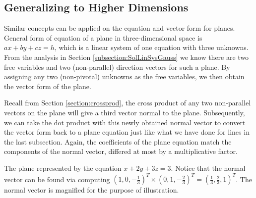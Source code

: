 \subsection{Generalizing to Higher Dimensions}
\label{section:vecgeohighdim}
Similar concepts can be applied on the equation and vector form for planes. General form of equation of a plane in three-dimensional space is $ax + by + cz = h$, which is a linear system of one equation with three unknowns. From the analysis in Section \ref{subsection:SolLinSysGauss} we know there are two free variables and two (non-parallel) direction vectors for such a plane. By assigning any two (non-pivotal) unknowns as the free variables, we then obtain the vector form of the plane. 
\par
Recall from Section \ref{section:crossprod}, the cross product of any two non-parallel vectors on the plane will give a third vector normal to the plane. Subsequently, we can take the dot product with this newly obtained normal vector to convert the vector form back to a plane equation just like what we have done for lines in the last subsection. Again, the coefficients of the plane equation match the components of the normal vector, differed at most by a multiplicative factor.
\begin{center}
\end{center}
The plane represented by the equation $x + 2y + 3z = 3$. Notice that the normal vector can be found via computing $(1, 0, -\frac{1}{3})^T \times (0, 1, -\frac{2}{3})^T = (\frac{1}{3}, \frac{2}{3}, 1)^T$. The normal vector is magnified for the purpose of illustration.

